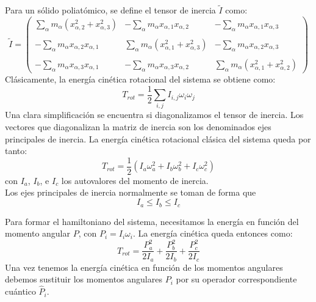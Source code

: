 \documentclass[a4paper]{article}
\begin{document}
Para un sólido poliatómico, se define el tensor de inercia $\tilde{I}$ como:
\begin{equation}
\tilde{I}=\begin{pmatrix}
\displaystyle\sum_{\alpha}m_{\alpha}\left(x^2_{\alpha,2}+x^2_{\alpha,3}\right) & -\displaystyle\sum_{\alpha}m_{\alpha}x_{\alpha,1}x_{\alpha,2} & -\displaystyle\sum_{\alpha}m_{\alpha}x_{\alpha,1}x_{\alpha,3} \\\\
-\displaystyle\sum_{\alpha}m_{\alpha}x_{\alpha,2}x_{\alpha,1} & \displaystyle\sum_{\alpha}m_{\alpha}\left(x^2_{\alpha,1}+x^2_{\alpha,3}\right) &-\displaystyle\sum_{\alpha}m_{\alpha}x_{\alpha,2}x_{\alpha,3} \\\\
-\displaystyle\sum_{\alpha}m_{\alpha}x_{\alpha,3}x_{\alpha,1} & -\displaystyle\sum_{\alpha}m_{\alpha}x_{\alpha,3}x_{\alpha,2} & \displaystyle\sum_{\alpha}m_{\alpha}\left(x^2_{\alpha,1}+x^2_{\alpha,2}\right) \end{pmatrix}
\end{equation}
Clásicamente, la energía cinética rotacional del sistema se obtiene como:
\begin{equation}
T_{rot}=\frac{1}{2}\sum_{i,j}I_{i,j}\omega_i\omega_j
\end{equation}
Una clara simplificación se encuentra si diagonalizamos el tensor de inercia. Los vectores que diagonalizan la matriz de inercia son los denominados ejes principales de inercia. La energía cinética rotacional clásica del sistema queda por tanto:
\begin{equation}
T_{rot}=\frac{1}{2}\left(I_a\omega^2_a + I_b\omega^2_b + I_c\omega^2_c\right) 
\end{equation}
con $I_a$, $I_b$, e $I_c$ los autovalores del momento de inercia.\\
Los ejes principales de inercia normalmente se toman de forma que
\begin{equation}
I_a \leq I_b \leq I_c
\end{equation}

Para formar el hamiltoniano del sistema, necesitamos la energía en función del momento angular $P$, con $P_i=I_i\omega_i$.
La energía cinética queda entonces como:
\begin{equation}
T_{rot}=\frac{P_a^2}{2I_a}+\frac{P_b^2}{2I_b}+\frac{P_c^2}{2I_c}
\end{equation}
Una vez tenemos la energía cinética en función de los momentos angulares debemos sustituir los momentos angulares $P_i$ por su operador correspondiente cuántico $\hat P_i$.\\
\end{document}
